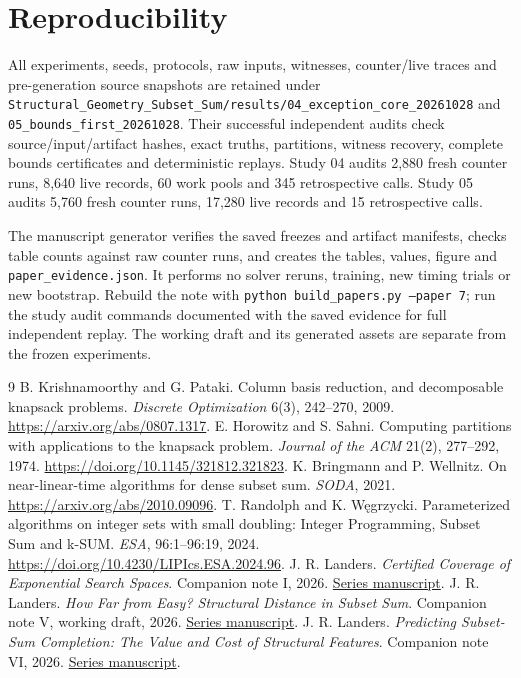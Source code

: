 \documentclass[10pt,english]{article}
\begin{document}
\section{Reproducibility}
All experiments, seeds, protocols, raw inputs, witnesses, counter/live traces and pre-generation source snapshots are retained under \texttt{Structural\_Geometry\_Subset\_Sum/results/04\_exception\_core\_20261028} and \texttt{05\_bounds\_first\_20261028}. Their successful independent audits check source/input/artifact hashes, exact truths, partitions, witness recovery, complete bounds certificates and deterministic replays. Study 04 audits 2,880 fresh counter runs, 8,640 live records, 60 work pools and 345 retrospective calls. Study 05 audits 5,760 fresh counter runs, 17,280 live records and 15 retrospective calls.

The manuscript generator verifies the saved freezes and artifact manifests, checks table counts against raw counter runs, and creates the tables, values, figure and \texttt{paper\_evidence.json}. It performs no solver reruns, training, new timing trials or new bootstrap. Rebuild the note with \texttt{python build\_papers.py --paper 7}; run the study audit commands documented with the saved evidence for full independent replay. The working draft and its generated assets are separate from the frozen experiments.

\begingroup\small
\begin{thebibliography}{9}
\setlength{\itemsep}{2pt}\setlength{\parskip}{2pt}
 B. Krishnamoorthy and G. Pataki. Column basis reduction, and decomposable knapsack problems. \emph{Discrete Optimization} 6(3), 242--270, 2009. \url{https://arxiv.org/abs/0807.1317}.
 E. Horowitz and S. Sahni. Computing partitions with applications to the knapsack problem. \emph{Journal of the ACM} 21(2), 277--292, 1974. \url{https://doi.org/10.1145/321812.321823}.
 K. Bringmann and P. Wellnitz. On near-linear-time algorithms for dense subset sum. \emph{SODA}, 2021. \url{https://arxiv.org/abs/2010.09096}.
 T. Randolph and K. W\k{e}grzycki. Parameterized algorithms on integer sets with small doubling: Integer Programming, Subset Sum and k-SUM. \emph{ESA}, 96:1--96:19, 2024. \url{https://doi.org/10.4230/LIPIcs.ESA.2024.96}.
 J. R. Landers. \emph{Certified Coverage of Exponential Search Spaces}. Companion note I, 2026. \href{../01-certified-coverage/Certified_Coverage_of_Exponential_Search_Spaces.pdf}{Series manuscript}.
 J. R. Landers. \emph{How Far from Easy? Structural Distance in Subset Sum}. Companion note V, working draft, 2026. \href{../05-structural-distance/Structural_Distance_in_Subset_Sum.pdf}{Series manuscript}.
 J. R. Landers. \emph{Predicting Subset-Sum Completion: The Value and Cost of Structural Features}. Companion note VI, 2026. \href{../06-learned-solvability/Predicting_Subset_Sum_Completion.pdf}{Series manuscript}.
\end{thebibliography}
\endgroup
\end{document}
